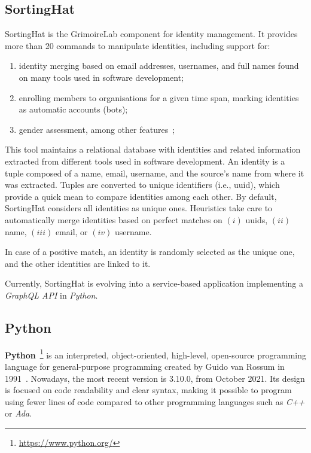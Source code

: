 \documentclass[a4paper, 12pt]{book}
\begin{document}
\subsection{SortingHat}
\label{sec:SortingHat}

SortingHat is the GrimoireLab component for identity management. It provides more than 20 commands to manipulate identities, including support for:

\begin{enumerate}[label=\roman*)]
    \item identity merging based on email addresses, usernames, and full names found on many tools used in software development;
    \item  enrolling members to organisations for a given time span, marking identities as automatic accounts (bots);
    \item gender assessment, among other features~\cite{moreno_et_al-sortinghat};
\end{enumerate}

This tool maintains a relational database with identities and related information extracted from different tools used in software development. An identity is a tuple composed of a name, email, username, and the source's name from where it was extracted. Tuples are converted to unique identifiers (i.e., uuid), which provide a quick mean to compare identities among each other. By default, SortingHat considers all identities as unique ones. Heuristics take care to automatically merge identities based on perfect matches on \((i)\) uuids, \((ii)\) name, \((iii)\) email, or \((iv)\) username.

In case of a positive match, an identity is randomly selected as the unique one, and the other identities are linked to it.

Currently, SortingHat is evolving into a service-based application implementing a \emph{GraphQL API} in \emph{Python}.

\subsection{Python}
\label{ssec:python}

\textbf{Python}~\footnote{\url{https://www.python.org/}} is an interpreted, object-oriented, high-level, open-source
programming language for general-purpose programming created by Guido van Rossum in 1991~\cite{van2007python}. Nowadays, the most
recent version is $3.10.0$, from October 2021. Its design is focused on code readability and clear syntax, making
it possible to program using fewer lines of code compared to other programming languages such as \emph{C++} or \emph{Ada}.
\end{document}
